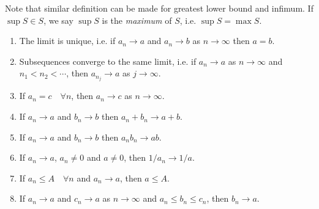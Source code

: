 \documentclass[10pt, a4paper, twoside]{report}
\begin{document}
Note that similar definition can be made for greatest lower bound and infimum. If \(\sup S\in S\), we say \(\sup S\) is the \emph{maximum} of \(S\), i.e. \(\sup S=\max S\).
\begin{lemma} \hfill
    \begin{enumerate}
        \item The limit is unique, i.e. if \(a_n\to a\) and \(a_n\to b\) as \(n\to\infty\) then \(a=b\).
        \item Subsequences converge to the same limit, i.e. if \(a_n\to a\) as \(n\to \infty\) and \(n_1<n_2<\cdots\), then \(a_{n_j}\to a\) as \(j\to\infty\).
        \item If \(a_n=c\quad\forall n\), then \(a_n\to c\) as \(n\to\infty\).
        \item If \(a_n\to a\) and \(b_n\to b\) then \(a_n+b_n\to a+b\).
        \item If \(a_n\to a\) and \(b_n\to b\) then \(a_nb_n\to ab\).
        \item If \(a_n\to a\), \(a_n\neq 0\) and \(a\neq 0\), then \(1/a_n\to 1/a\).
        \item If \(a_n\leq A\quad\forall n\) and \(a_n\to a\), then \(a\leq A\).
        \item If \(a_n\to a\) and \(c_n\to a\) as \(n\to\infty\) and
        \(a_n\leq b_n\leq c_n\), then \(b_n\to a\).
    \end{enumerate}
    \label{fundlemma}
\end{lemma}
\end{document}
